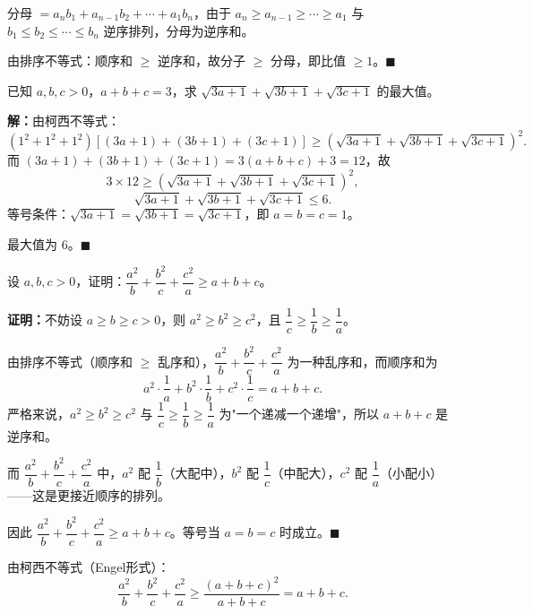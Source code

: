 \documentclass[12pt, a4paper]{ctexart}
\begin{document}
分母 $= a_n b_1 + a_{n-1} b_2 + \cdots + a_1 b_n$，由于 $a_n \geqslant a_{n-1} \geqslant \cdots \geqslant a_1$ 与 $b_1 \leqslant b_2 \leqslant \cdots \leqslant b_n$ 逆序排列，分母为逆序和。

由排序不等式：顺序和 $\geqslant$ 逆序和，故分子 $\geqslant$ 分母，即比值 $\geqslant 1$。\hfill $\blacksquare$

\begin{examplebox}[【例题11】柯西不等式综合题]
已知 $a, b, c > 0$，$a + b + c = 3$，求 $\sqrt{3a+1} + \sqrt{3b+1} + \sqrt{3c+1}$ 的最大值。
\end{examplebox}

\textbf{解：}由柯西不等式：
\[
  (1^2 + 1^2 + 1^2)\!\left[(3a+1) + (3b+1) + (3c+1)\right] \geqslant \left(\sqrt{3a+1} + \sqrt{3b+1} + \sqrt{3c+1}\right)^2.
\]
而 $(3a+1) + (3b+1) + (3c+1) = 3(a+b+c) + 3 = 12$，故
\[
  3 \times 12 \geqslant \left(\sqrt{3a+1} + \sqrt{3b+1} + \sqrt{3c+1}\right)^2,
\]
\[
  \sqrt{3a+1} + \sqrt{3b+1} + \sqrt{3c+1} \leqslant 6.
\]
等号条件：$\sqrt{3a+1} = \sqrt{3b+1} = \sqrt{3c+1}$，即 $a = b = c = 1$。

最大值为 $\boxed{6}$。\hfill $\blacksquare$

\begin{examplebox}[【例题12】排序不等式与不等式证明]
设 $a, b, c > 0$，证明：$\dfrac{a^2}{b} + \dfrac{b^2}{c} + \dfrac{c^2}{a} \geqslant a + b + c$。
\end{examplebox}

\textbf{证明：}不妨设 $a \geqslant b \geqslant c > 0$，则 $a^2 \geqslant b^2 \geqslant c^2$，且 $\dfrac{1}{c} \geqslant \dfrac{1}{b} \geqslant \dfrac{1}{a}$。

由排序不等式（顺序和 $\geqslant$ 乱序和），$\dfrac{a^2}{b} + \dfrac{b^2}{c} + \dfrac{c^2}{a}$ 为一种乱序和，而顺序和为
\[
  a^2 \cdot \frac{1}{a} + b^2 \cdot \frac{1}{b} + c^2 \cdot \frac{1}{c} = a + b + c.
\]
严格来说，$a^2 \geqslant b^2 \geqslant c^2$ 与 $\dfrac{1}{c} \geqslant \dfrac{1}{b} \geqslant \dfrac{1}{a}$ 为"一个递减一个递增"，所以 $a + b + c$ 是逆序和。

而 $\dfrac{a^2}{b} + \dfrac{b^2}{c} + \dfrac{c^2}{a}$ 中，$a^2$ 配 $\dfrac{1}{b}$（大配中），$b^2$ 配 $\dfrac{1}{c}$（中配大），$c^2$ 配 $\dfrac{1}{a}$（小配小）——这是更接近顺序的排列。

因此 $\dfrac{a^2}{b} + \dfrac{b^2}{c} + \dfrac{c^2}{a} \geqslant a + b + c$。等号当 $a = b = c$ 时成立。\hfill $\blacksquare$

\begin{tipbox}[另证（柯西不等式）]
由柯西不等式（Engel形式）：
\[
  \frac{a^2}{b} + \frac{b^2}{c} + \frac{c^2}{a} \geqslant \frac{(a+b+c)^2}{a+b+c} = a + b + c.
\]
\end{tipbox}
\end{document}
